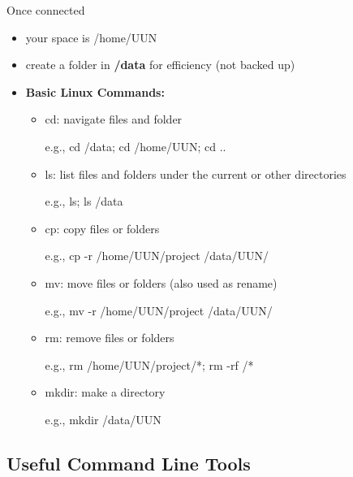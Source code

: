 \documentclass[10pt]{beamer}
\begin{document}
\begin{frame}[fragile]{Once connected}

\begin{itemize}
    \item your space is /home/UUN
    \item create a folder in \textbf{/data} for efficiency (not backed up)
    \newline
    \item{
    \textbf{Basic Linux Commands: }
    \begin{itemize}
        \item {cd: navigate files and folder
        
        \quad e.g., cd /data; cd /home/UUN; cd ..}
        \item {ls: list files and folders under the current or other directories
        
        \quad e.g., ls; ls /data}
        \item {cp: copy files or folders
        
        \quad e.g., cp -r /home/UUN/project /data/UUN/}
        \item {mv: move files or folders (also used as rename)
        
        \quad e.g., mv -r /home/UUN/project /data/UUN/}
        \item {rm: remove files or folders
        
        \quad e.g., rm /home/UUN/project/*; rm -rf /*}
        \item {mkdir: make a directory
        
        \quad e.g., mkdir /data/UUN}
    \end{itemize}
    }
\end{itemize}

\end{frame}

\subsection{Useful Command Line Tools}
\end{document}

